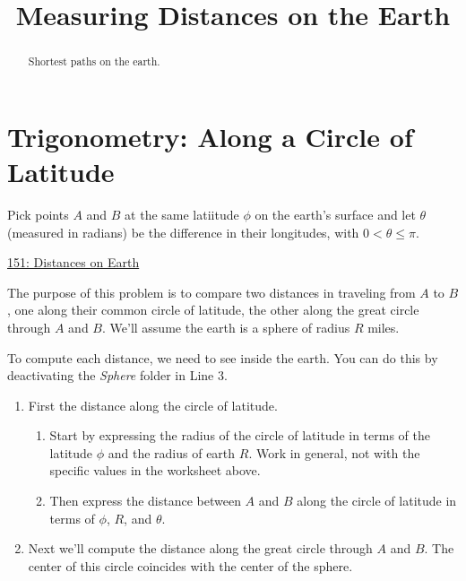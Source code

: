 \documentclass{ximera}
\title{Measuring Distances on the Earth}
\begin{document}
\begin{abstract}
Shortest paths on the earth.
\end{abstract}
\maketitle


\section{Trigonometry: Along a Circle of Latitude}

\begin{question} \label{Q34dgbnhhtrg}

Pick points $A$ and $B$ at the same latiitude $\phi$ on the earth's surface and let $\theta$ (measured in radians) be the difference in their longitudes, with $0<\theta \leq \pi$.

\begin{onlineOnly}
   \begin{center}
\end{center}
\end{onlineOnly}

\href{https://www.desmos.com/3d/hhpog6ijnr}{151: Distances on Earth}

The purpose of this problem is to compare two distances in traveling from $A$ to $B$, one along their common circle of latitude, the other along the great circle through $A$ and $B$. We'll assume the earth is a sphere of radius $R$ miles.

To compute each distance, we need to see inside the earth. You can do this by deactivating the \emph{Sphere} folder in Line 3.

\begin{enumerate}
\item First the distance along the circle of latitude.

\begin{enumerate}
\item Start by expressing the radius of the circle of latitude in terms of the latitude $\phi$ and the radius of earth $R$. Work in general, not with the specific values in the worksheet above.

\item Then express the distance between $A$ and $B$ along the circle of latitude in terms of $\phi$, $R$, and $\theta$.
\end{enumerate}

\item Next we'll compute the distance along the great circle through $A$ and $B$. The center of this circle coincides with the center of the sphere.


\end{enumerate}
\end{question}
\end{document}
